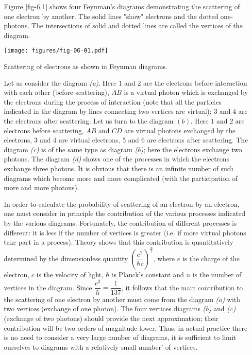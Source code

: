 \documentclass[a4paper,sfsidenotes,colorlinks=true]{tufte-book}
\numberwithin{equation}{section}
\numberwithin{figure}{section}
\begin{document}
\hyperref[fig-6.1]{Figure \ref{fig-6.1}} shows four Feynman's
diagrams demonstrating the scattering of one electron by another. The
solid lines "show" electrons and the dotted one-photons. The
intersections of solid and dotted lines are called the vertices of the
diagram. 

\begin{marginfigure}%
\centering
\texttt{[image: figures/fig-06-01.pdf]}
\caption{Scattering of electrons as shown in Feynman diagrams.}
\label{fig-6.1}
\end{marginfigure}


Let us consider the diagram \emph{(a)}. Here 1 and 2 are the electrons
before interaction with each other (before scattering), $AB$ is a
virtual photon which is exchanged by the electrons during the process
of interaction (note that all the particles indicated in the diagram
by lines connecting two vertices are virtual); 3 and 4 are the
electrons after scattering. Let us turn to the diagram $(b)$. Here 1
and 2 are electrons before scattering, $AB$ and $CD$ are virtual
photons exchanged by the electrons, 3 and 4 are virtual electrons, 5
and 6 are electrons after scattering. The diagram \emph{(c)} is of the
same type as diagram \emph{(b)}; here the electrons exchange two
photons. The diagram \emph{(d)} shows one of the processes in which
the electrons exchange three photons. It is obvious that there is an
infinite number of such diagrams which become more and more
complicated (with the participation of more and more photons).


In order to calculate the probability of scattering of an electron by
an electron, one must consider in principle the contribution of the
various processes indicated by the various diagrams. Fortunately, the
contribution of different processes is different: it is less if the
number of vertices is greater (i.e. if more virtual photons take part
in a process). Theory shows that this contribution is quantitatively
determined by the dimensionless quantity $\left( \dfrac{e^{2}}{\hbar
    c}\right)^{\frac{n}{2}}$, where $e$ is the charge of the electron,
$c$ is the velocity of light, $\hbar$ is Planck's constant and $n$ is
the number of vertices in the diagram. Since $\dfrac{e^{2}}{\hbar} =
\dfrac{1}{137}$, it follows that the main contribution to the
scattering of one electron by another must come from the diagram
\emph{(a)} with two vertices (exchange of one photon). The four
vertices diagrams \emph{(b)} and \emph{(c)} (exchange of two photons)
should provide the next approximation; their contribution will be two
orders of magnitude lower. Thus, in actual practice there is no need
to consider a very large number of diagrams, it is sufficient to limit
ourselves to diagrams with a relatively small number' of vertices.
\end{document}
